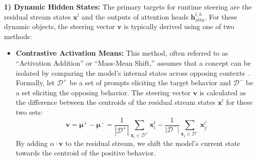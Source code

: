 \documentclass[11pt,letterpaper]{mystyle}
\begin{document}
\textbf{1) Dynamic Hidden States:} The primary targets for runtime steering are the residual stream states $\mathbf{x}^l$ and the outputs of attention heads $\mathbf{h}_{\text{attn}}^{l,h}$. For these dynamic objects, the steering vector $\mathbf{v}$ is typically derived using one of two methods:
\begin{itemize}
    \item \textbf{Contrastive Activation Means:} This method, often referred to as ``Activation Addition'' or ``Mass-Mean Shift,'' assumes that a concept can be isolated by comparing the model's internal states across opposing contexts~\citep{rimsky-etal-2024-steering,van2024extending,lu2024investigating,postmus2024steering,turner2024steeringlanguagemodelsactivation,sharma2025steeringconceptualbiastransformer}. Formally, let $\mathcal{D}^+$ be a set of prompts eliciting the target behavior and $\mathcal{D}^-$ be a set eliciting the opposing behavior. The steering vector $\mathbf{v}$ is calculated as the difference between the centroids of the residual stream states $\mathbf{x}^l$ for these two sets:
    \begin{equation}
    \mathbf{v} = \boldsymbol{\mu}^+ - \boldsymbol{\mu}^- = \frac{1}{|\mathcal{D}^+|}\sum_{\mathbf{x}_i \in \mathcal{D}^+} \mathbf{x}^l_i - \frac{1}{|\mathcal{D}^-|}\sum_{\mathbf{x}_j \in \mathcal{D}^-} \mathbf{x}^l_j
    \end{equation}
    By adding $\alpha \cdot \mathbf{v}$ to the residual stream, we shift the model's current state towards the centroid of the positive behavior.


\end{itemize}
\end{document}
